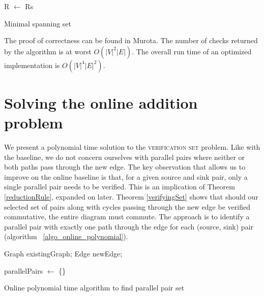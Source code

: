 \documentclass[sigplan,review,anonymous]{acmart}
\begin{document}
{\begin{algorithm}
R $\gets$ Rs\;
\;

\caption{Minimal spanning set}\label{algo_minimal_spanning_set}
\end{algorithm}

The proof of correctness can be found in Murota\cite{commutative}.
The number of checks returned by the algorithm is at worst $O(|V|^2|E|)$. The overall run time of an optimized implementation is $O(|V|^4|E|^2)$.

\section{Solving the online addition problem}

We present a polynomial time solution to the \textsc{verification set} problem.
Like with the baseline, we do not concern ourselves with parallel pairs where neither or both paths pass through the new edge.
The key observation that allows us to improve on the online baseline is that, for a given source and sink pair, only a single parallel pair needs to be verified. 
This is an implication of Theorem \ref{reductionRule}, expanded on later.
Theorem \ref{verifyingSet} shows that should our selected set of pairs along with cycles passing through the new edge be verified commutative, the entire diagram must commute. 
The approach is to identify a parallel pair with exactly one path through the edge for each (source, sink) pair (algorithm ~\ref{algo_online_polynomial}).

\begin{algorithm}
\DontPrintSemicolon
{}
Graph existingGraph;
Edge newEdge;

parallelPairs $\gets$ \{\}\;
\;
\caption{Online polynomial time algorithm to find parallel pair set}
\label{algo_online_polynomial}
\end{algorithm}

}
\end{document}
